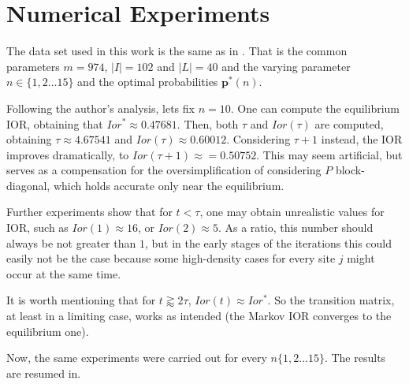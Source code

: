 \documentclass{article}
\newcommand{\pp}{\mathbf{p}}
\begin{document}
\section{Numerical Experiments}\label{sec4}
The data set used in this work is the same as in \citep{Carrasco}. That is the common parameters $m = 974$, $|I| = 102$ and $|L| = 40$ and the varying parameter $n \in\{1, 2 \dots 15\}$ and the optimal probabilities $\pp^*(n)$.\par
Following the author's analysis, lets fix $n=10$. One can compute the equilibrium IOR, obtaining that $Ior^* \approx 0.47681$. Then, both $\tau$ and $Ior(\tau)$ are computed, obtaining $\tau \approx 4.67541$ and $Ior(\tau) \approx 0.60012$. Considering $\tau+1$ instead, the IOR improves dramatically, to $Ior(\tau+1) \approx = 0.50752$. This may seem artificial, but serves as a compensation for the  oversimplification of considering $P$ block-diagonal, which holds accurate only near the equilibrium.\par
Further experiments show that for $t < \tau$, one may obtain unrealistic values for IOR, such as $Ior(1) \approx 16$, or $Ior(2) \approx 5$. As a ratio, this number should always be not greater than $1$, but in the early stages of the iterations this could easily not be the case because some high-density cases for every site $j$ might occur at the same time.\par
It is worth mentioning that for $t \gtrapprox 2\tau$, $Ior(t) \approx Ior^*$. So the transition matrix, at least in a limiting case, works as intended (the Markov IOR converges to the equilibrium one).\par
Now, the same experiments were carried out for every $n \{ 1,2 \dots 15\}$. The results are resumed in. %
\end{document}
